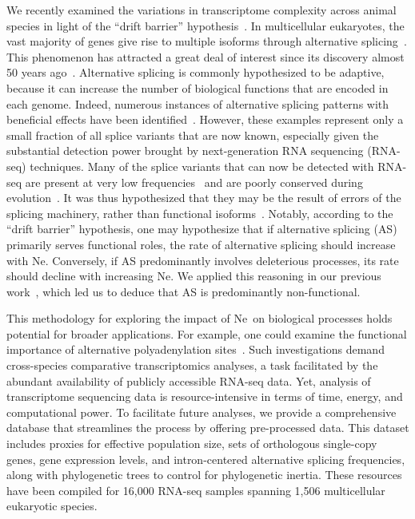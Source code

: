 We recently examined the variations in transcriptome complexity across animal species in light of the “drift barrier” hypothesis~\citep{benitiere_random_2024}. 
In multicellular eukaryotes, the vast majority of genes give rise to multiple isoforms through alternative splicing~\citep{chen_correcting_2014}. This phenomenon has attracted a great deal of interest since its discovery almost 50 years ago~\citep{berget_spliced_1977}. Alternative splicing is commonly hypothesized to be adaptive, because it can increase the number of biological functions that are encoded in each genome. Indeed, numerous instances of alternative splicing patterns with beneficial effects have been identified~\citep{mudge_origins_2011, barbosa-morais_evolutionary_2012, merkin_evolutionary_2012, reyes_drift_2013, verta_role_2022, singh_importance_2022, wright_alternative_2022}. However, these examples represent only a small fraction of all splice variants that are now known, especially given the substantial detection power brought by next-generation RNA sequencing (RNA-seq) techniques. Many of the splice variants that can now be detected with RNA-seq are present at very low frequencies~\citep{gonzalez-porta_transcriptome_2013, tress_alternative_2017} and are poorly conserved during evolution~\citep{barbosa-morais_evolutionary_2012, merkin_evolutionary_2012}. It was thus hypothesized that they may be the result of errors of the splicing machinery, rather than functional isoforms~\citep{pickrell_noisy_2010, gout_large-scale_2013, xu_human_2014, saudemont_fitness_2017, xu_alternative_2018, liu_most_2018, liu_human_2018, xu_evidence_2019, xu_different_2020, zhang_gene_2022}. Notably, according to the “drift barrier” hypothesis, one may hypothesize that if alternative splicing (\acrshort{AS}) primarily serves functional roles, the rate of alternative splicing should increase with \acrshort{Ne}. Conversely, if \acrshort{AS} predominantly involves deleterious processes, its rate should decline with increasing \acrshort{Ne}. We applied this reasoning in our previous work~\citep{benitiere_random_2024}, which led us to deduce that \acrshort{AS} is predominantly non-functional.

This methodology for exploring the impact of \acrshort{Ne}~on biological processes holds potential for broader applications. For example, one could examine the functional importance of alternative polyadenylation sites~\citep{xu_alternative_2018}.
Such investigations demand cross-species comparative transcriptomics analyses, a task facilitated by the abundant availability of publicly accessible RNA-seq data. Yet, analysis of transcriptome sequencing data is resource-intensive in terms of time, energy, and computational power. To facilitate future analyses, we provide a comprehensive database that streamlines the process by offering pre-processed data. This dataset includes proxies for effective population size, sets of orthologous single-copy genes, gene expression levels, and intron-centered alternative splicing frequencies, along with phylogenetic trees to control for phylogenetic inertia. These resources have been compiled for 16,000 RNA-seq samples spanning 1,506 multicellular eukaryotic species.

